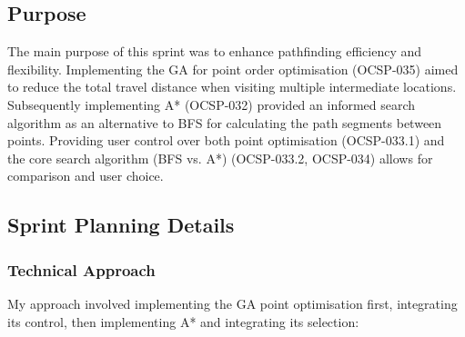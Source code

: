 \subsection{Purpose}
The main purpose of this sprint was to enhance pathfinding efficiency and flexibility. Implementing the GA for point order optimisation (OCSP-035) aimed to reduce the total travel distance when visiting multiple intermediate locations. Subsequently implementing A* (OCSP-032) provided an informed search algorithm as an alternative to BFS for calculating the path segments between points. Providing user control over both point optimisation (OCSP-033.1) and the core search algorithm (BFS vs. A*) (OCSP-033.2, OCSP-034) allows for comparison and user choice.

\clearpage
\subsection{Sprint Planning Details}

\subsubsection{Technical Approach}
My approach involved implementing the GA point optimisation first, integrating its control, then implementing A* and integrating its selection:

